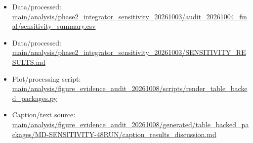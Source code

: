 \begin{itemize}[leftmargin=1.4em,noitemsep]
\item Data/processed: \begingroup\scriptsize\url{main/analysis/phase2_integrator_sensitivity_20261003/audit_20261004_final/sensitivity_summary.csv}\endgroup
\item Data/processed: \begingroup\scriptsize\url{main/analysis/phase2_integrator_sensitivity_20261003/SENSITIVITY_RESULTS.md}\endgroup
\item Plot/processing script: \begingroup\scriptsize\url{main/analysis/figure_evidence_audit_20261008/scripts/render_table_backed_packages.py}\endgroup
\item Caption/text source: \begingroup\scriptsize\url{main/analysis/figure_evidence_audit_20261008/generated/table_backed_packages/MD-SENSITIVITY-48RUN/caption_results_discussion.md}\endgroup
\end{itemize}
